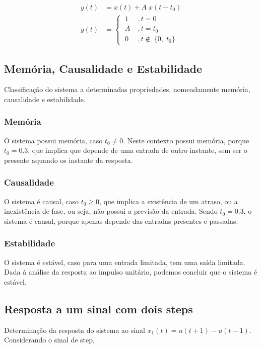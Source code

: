 \documentclass[12pt,a4paper]{article}
\begin{document}
\begin{equation}
	\begin{split}
		y(t) &= x(t) + A \; x(t - t_0) \\
		y(t) &= 
		\begin{cases}
			\; 1 \; &, t = 0 \\
			\; A \;&, t = t_0 \\
			\; 0 \; &, t \not \in \; \{0, \; t_0\}
		\end{cases}
	\end{split}
\end{equation}



\newpage
\subsection{Memória, Causalidade e Estabilidade}
Classificação do sistema a determinadas propriedades, nomeadamente memória, 
causalidade e estabilidade.

\subsubsection{Memória}
O sistema possui memória, caso $t_0 \neq 0$. Neste contexto possui memória,
porque $t_0 = 0.3$, que implica que depende de uma entrada de outro instante,
sem ser o presente aquando os instante da resposta.

\subsubsection{Causalidade}
O sistema é causal, caso $t_0 \geq 0$, que implica a existência de um atraso,
ou a inexistência de fase, ou seja, não possui a previsão da entrada. Sendo
$t_0 = 0.3$, o sistema é causal, porque apenas depende das entradas presentes e 
passadas.

\subsubsection{Estabilidade}
O sistema é estável, caso para uma entrada limitada, tem uma saída limitada.
Dada à análise da resposta ao impulso unitário, podemos concluir que o sistema
é estável.

\newpage
\subsection{Resposta a um sinal com dois steps}
Determinação da resposta do sistema ao sinal $x_1(t) = u(t+1) - u(t-1)$.
Considerando o sinal de step,
\end{document}
